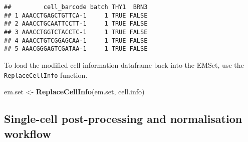 \documentclass[]{article}
\newenvironment{Shaded}{\begin{snugshade}}{\end{snugshade}}
\newcommand{\CommentTok}[1]{\textcolor[rgb]{0.56,0.35,0.01}{\textit{#1}}}
\newcommand{\DataTypeTok}[1]{\textcolor[rgb]{0.13,0.29,0.53}{#1}}
\newcommand{\DecValTok}[1]{\textcolor[rgb]{0.00,0.00,0.81}{#1}}
\newcommand{\KeywordTok}[1]{\textcolor[rgb]{0.13,0.29,0.53}{\textbf{#1}}}
\newcommand{\NormalTok}[1]{#1}
\newcommand{\OperatorTok}[1]{\textcolor[rgb]{0.81,0.36,0.00}{\textbf{#1}}}
\newcommand{\StringTok}[1]{\textcolor[rgb]{0.31,0.60,0.02}{#1}}
\begin{document}
\begin{Shaded}
\end{Shaded}

\begin{verbatim}
##         cell_barcode batch THY1  BRN3
## 1 AAACCTGAGCTGTTCA-1     1 TRUE FALSE
## 2 AAACCTGCAATTCCTT-1     1 TRUE FALSE
## 3 AAACCTGGTCTACCTC-1     1 TRUE FALSE
## 4 AAACCTGTCGGAGCAA-1     1 TRUE FALSE
## 5 AAACGGGAGTCGATAA-1     1 TRUE FALSE
\end{verbatim}

To load the modified cell information dataframe back into the EMSet, use
the \texttt{ReplaceCellInfo} function.

\begin{Shaded}
\begin{Highlighting}[]
\NormalTok{em.set <-}\StringTok{ }\KeywordTok{ReplaceCellInfo}\NormalTok{(em.set, cell.info)}
\end{Highlighting}
\end{Shaded}

\hypertarget{single-cell-post-processing-and-normalisation-workflow}{%
\subsection{Single-cell post-processing and normalisation
workflow}\label{single-cell-post-processing-and-normalisation-workflow}}
\end{document}
